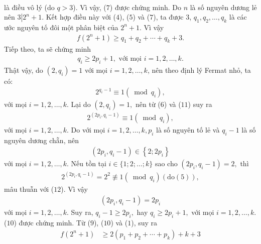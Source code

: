 \begin{multicols}{2}
\begin{align*}
	\end{align*}
	là điều vô lý (do $q > 3$). Vì vậy, ($7$) được chứng minh.
	\vskip 0.05cm
	Do $n$ là số nguyên dương lẻ nên $3\left| {{2^n} + 1} \right..$ Kết hợp điều này với ($4$), ($5$) và ($7$), ta được $3$, ${q_1},{q_2}, \ldots ,{q_k}$ là các ước nguyên tố đôi một phân biệt của  $2^n + 1$. Vì vậy
	\begin{align*}
		f\left( {{2^n} + 1} \right) \ge {q_1} + {q_2} +  \cdots  + {q_k} + 3. \tag{$9$}
	\end{align*}
	Tiếp theo, ta sẽ chứng minh
	\begin{align*}
		{q_i} \ge 2{p_i} + 1, \text{ với mọi  } i = 1, 2, \ldots, k.\tag{$10$}
	\end{align*}                                   
	Thật vậy, do $\left( {2,{q_i}} \right) = 1$  với mọi $i = 1, 2, \ldots, k$, nên theo định lý Fermat nhỏ, ta có:
	\begin{align*}
		{2^{{q_i} - 1}} \equiv 1\left( {\bmod {q_i}} \right), \tag{$11$}
	\end{align*}
	với mọi $i = 1, 2, \ldots, k$.
	\vskip 0.05cm
	Lại do  $\left( {2,{q_i}} \right) = 1,$ nên từ ($6$) và ($11$) suy ra
	\begin{align*}
		{2^{\left( {2{p_i},{q_i} - 1} \right)}} \equiv 1\left( {\bmod {q_i}} \right), \tag{$12$}
	\end{align*}
	với mọi $i = 1, 2, \ldots, k$.
	\vskip 0.05cm
	Do với mọi $i = 1, 2, \ldots, k, p_i$  là số nguyên tố lẻ và $q_i -1$  là số nguyên dương chẵn, nên
	\begin{align*}
		\left( {2{p_i},{q_i} - 1} \right) \in \left\{ {2;2{p_i}} \right\}
	\end{align*}
	với mọi $i = 1, 2, \ldots, k$.
	\vskip 0.05cm
	Nếu tồn tại $i \in \{1; 2; \ldots; k\}$ sao cho $\left( {2{p_i},{q_i} - 1} \right) = 2,$  thì
	\begin{align*}
		{2^{\left( {2{p_i},{q_i} - 1} \right)}} = {2^2}\not  \equiv 1\left( {\bmod {q_i}} \right)\left( {{\text{do}}\left( 5 \right)} \right),	
	\end{align*}
	mâu thuẫn với ($12$). Vì vậy
	\begin{align*}
		\left( {2{p_i},{q_i} - 1} \right) = 2{p_i}
	\end{align*}
	với mọi $i = 1, 2, \ldots, k$.
	\vskip 0.05cm
	Suy ra, ${q_i} - 1 \ge 2{p_i},$  hay ${q_i} \ge 2{p_i} + 1,$  với mọi $i = 1, 2, \ldots, k$.
	\vskip 0.05cm
	($10$) được chứng minh.
	\vskip 0.05cm
	Từ ($9$), ($10$) và ($1$), suy ra
	\begin{align*}
		f\left( {{2^n} + 1} \right) &\ge 2\left( {{p_1} + {p_2} +  \cdots  + {p_k}} \right) + k + 3 \\

\end{align*}
\end{multicols}

